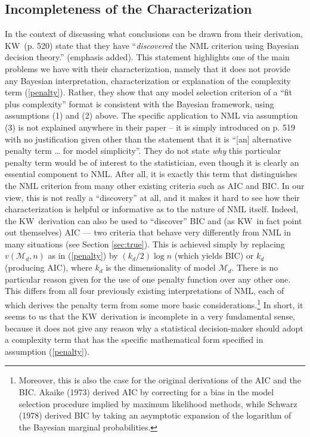 \documentclass[authoryear]{elsarticle}
\newcommand{\model}{\mathcal{M}}
\newcommand{\kw}{KW}
\begin{document}
\subsection{Incompleteness of the Characterization}
\label{sec:incomplete}
In the context of discussing what conclusions can be drawn from their
derivation, \kw\ (p. 520) state that they have ``{\it discovered} the NML
criterion using Bayesian decision theory.'' (emphasis added). This
statement highlights one of the main problems we have with their
characterization, namely that it
 does not provide any Bayesian interpretation,
characterization or explanation of the complexity term (\ref{penalty}).
Rather, they show that any model selection criterion of a
``fit plus complexity'' format is consistent with the Bayesian framework,
using assumptions (1) and (2) above. The specific application to NML
via assumption (3) is not explained anywhere in their paper -- it is
simply introduced on p. 519 with no justification given other than the
statement that it is ``[an] alternative penalty term \ldots\/ for model
simplicity''. They do not state {\it why} this particular penalty
term would be of interest to the statistician, even though it is clearly
an essential component to NML. After all, it is exactly this term that
distinguishes the NML criterion from many other existing criteria such
as AIC and BIC. In our view, this is not really a ``discovery'' at all, and
it makes it hard to see how their characterization is helpful or informative
as to the nature of NML itself.
Indeed, the \kw\ derivation can also be used to ``discover'' BIC and
(as \kw\ in fact point out themselves) AIC --- two criteria that
behave very differently from NML in many situations (see Section
\ref{sec:true}).
This is achieved simply by replacing
$v(\model_d,n)$ as in (\ref{penalty}) by $(k_d/2) \log n$ (which yields
BIC) or $k_d$ (producing AIC), where $k_d$ is the dimensionality of
model  $\model_d$. There is no particular reason given for the use
of one penalty function over any other one.
This differs from all four previously existing
interpretations of NML, each of which derives the penalty term from
some more basic considerations.\footnote{Moreover, this is also the
case for the original derivations of the AIC and the BIC.
Akaike (1973) derived AIC
by correcting for a  bias in the model selection procedure implied by
maximum likelihood methods, while Schwarz (1978) derived BIC by
taking an asymptotic expansion of the logarithm of the Bayesian
marginal probabilities.} In short, it seems to us that the \kw\ derivation
is incomplete in a very fundamental sense, because it does not
give any reason why a statistical decision-maker should adopt
a complexity term that has the specific mathematical form specified
in  assumption (\ref{penalty}).
\end{document}
